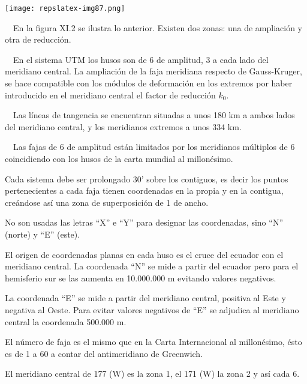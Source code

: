 \documentclass{tufte-book}
\begin{document}
\begin{marginfigure}
\texttt{[image: repslatex-img87.png]}
\end{marginfigure}

\ \ En la figura XI.2 se ilustra lo anterior. Existen dos zonas: una de
ampliación y otra de reducción.

\ \ En el sistema UTM los husos son de 6{\textordmasculine} de amplitud,
3{\textordmasculine} a cada lado del meridiano central. La ampliación
de la faja meridiana respecto de Gauss-Kruger, se hace compatible con
los módulos de deformación en los extremos por haber introducido en
el meridiano central el factor de reducción  ${k_{{0}}}$.

\ \ Las líneas de tangencia se encuentran situadas a unos 180 km a
ambos lados del meridiano central, y los meridianos extremos a unos 334
km. 

\ \ Las fajas de 6{\textordmasculine} de amplitud están limitados por
los meridianos múltiplos de 6{\textordmasculine} coincidiendo con los
husos de la carta mundial al millonésimo.

Cada sistema debe ser prolongado 30{\textquoteright} sobre los
contiguos, es decir los puntos pertenecientes a cada faja tienen
coordenadas en la propia y en la contigua, creándose así una zona
de superposición de 1{\textordmasculine} de ancho.

No son usadas las letras {\textquotedblleft}X{\textquotedblright} e
{\textquotedblleft}Y{\textquotedblright} para designar las coordenadas,
sino {\textquotedblleft}N{\textquotedblright} (norte) y
{\textquotedblleft}E{\textquotedblright} (este).

El origen de coordenadas planas en cada huso es el cruce del ecuador con
el meridiano central. La coordenada
{\textquotedblleft}N{\textquotedblright} se mide a partir del ecuador
pero para el hemisferio sur se las aumenta en 10.000.000 m evitando
valores negativos.

La coordenada {\textquotedblleft}E{\textquotedblright} se mide a partir
del meridiano central, positiva al Este y negativa al Oeste. Para
evitar valores negativos de {\textquotedblleft}E{\textquotedblright} se
adjudica al meridiano central la coordenada 500.000 m.

El número de faja es el mismo que en la Carta Internacional al
millonésimo, ésto es de 1 a 60 a contar del antimeridiano de
Greenwich.

El meridiano central de 177{\textordmasculine} (W) es la zona 1, el
171{\textordmasculine} (W) la zona 2 y así cada 6{\textordmasculine}.
\end{document}
